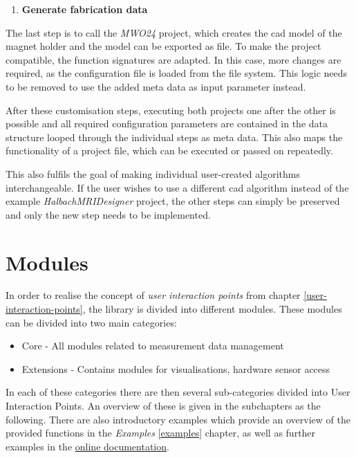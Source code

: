 \newpage

\begin{enumerate}
\def\labelenumi{\arabic{enumi}.}
\setcounter{enumi}{2}
\tightlist
\item
  \textbf{Generate fabrication data}
\end{enumerate}

The last step is to call the \emph{MWO24}  project,
which creates the \gls{cad} model of the magnet holder and the model can
be exported as file. To make the project compatible, the function
signatures are adapted. In this case, more changes are required, as the
configuration file is loaded from the file system. This logic needs to
be removed to use the added meta data as input parameter instead.

After these customisation steps, executing both projects one after the
other is possible and all required configuration parameters are
contained in the data structure looped through the individual steps as
meta data. This also maps the functionality of a project file, which can
be executed or passed on repeatedly.

This also fulfils the goal of making individual user-created algorithms
interchangeable. If the user wishes to use a different \gls{cad}
algorithm instead of the example \emph{HalbachMRIDesigner}
 project, the other steps can simply be preserved and
only the new step needs to be implemented.

\hypertarget{modules}{%
\section{Modules}\label{modules}}

In order to realise the concept of \emph{user interaction points} from
chapter \ref{user-interaction-points}, the library is divided into
different modules. These modules can be divided into two main
categories:

\begin{itemize}
\tightlist
\item
  Core - All modules related to measurement data management
\item
  Extensions - Contains modules for visualisations, hardware sensor
  access
\end{itemize}

In each of these categories there are then several sub-categories
divided into User Interaction Points. An overview of these is given in
the subchapters as the following. There are also introductory examples
which provide an overview of the provided functions in the
\emph{Examples} \ref{examples} chapter, as well as further examples in
the
\href{https://magneticreadoutprocessing.readthedocs.io/en/latest/}{online documentation}.


